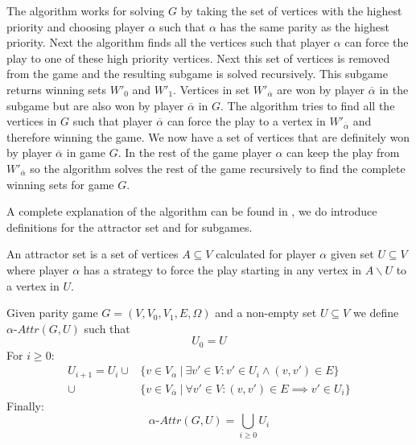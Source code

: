 The algorithm works for solving $G$ by taking the set of vertices with the highest priority and choosing player $\alpha$ such that $\alpha$ has the same parity as the highest priority. Next the algorithm finds all the vertices such that player $\alpha$ can force the play to one of these high priority vertices. Next this set of vertices is removed from the game and the resulting subgame is solved recursively. This subgame returns winning sets $W'_0$ and $W'_1$. Vertices in set $W'_{\overline{\alpha}}$ are won by player $\overline{\alpha}$ in the subgame but are also won by player $\overline{\alpha}$ in $G$. The algorithm tries to find all the vertices in $G$ such that player $\overline{\alpha}$ can force the play to a vertex in $W'_{\overline{\alpha}}$ and therefore winning the game. We now have a set of vertices that are definitely won by player $\overline{\alpha}$ in game $G$. In the rest of the game player $\alpha$ can keep the play from $W'_{\overline{\alpha}}$ so the algorithm solves the rest of the game recursively to find the complete winning sets for game $G$.

A complete explanation of the algorithm can be found in \cite{ZIELONKA1998135}, we do introduce definitions for the attractor set and for subgames. 

An attractor set is a set of vertices $A \subseteq V$ calculated for player $\alpha$ given set $U \subseteq V$ where player $\alpha$ has a strategy to force the play starting in any vertex in $A \backslash U$ to a vertex in $U$.

\begin{definition}\cite{ZIELONKA1998135}
	\label{def_attr}Given parity game $G = (V,V_0,V_1,E,\Omega)$ and a non-empty set $U \subseteq V$ we define $\alpha\textit{-Attr}(G,U)$ such that
	\[U_0 = U \]
	For $i \geq 0$:
	\begin{align*}
	U_{i+1} = U_i\cup
	&\{v \in V_\alpha\ |\ \exists v' \in V : v' \in U_i \wedge (v,v') \in E \}\\
	\cup &\{v \in V_{\overline{\alpha}}\ |\ \forall v' \in V :(v,v') \in E \implies v' \in U_i \}
	\end{align*}
	Finally:
	\[\alpha\textit{-Attr}(G,U) = \bigcup_{i \geq 0} U_i \]
\end{definition}

